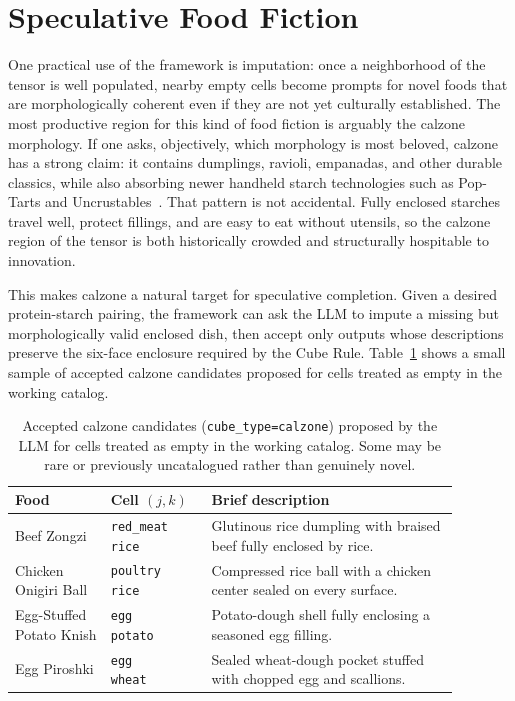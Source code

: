 \section{Speculative Food Fiction}

One practical use of the framework is imputation: once a neighborhood of the tensor is well populated, nearby empty cells become prompts for novel foods that are morphologically coherent even if they are not yet culturally established.
The most productive region for this kind of food fiction is arguably the calzone morphology.
If one asks, objectively, which morphology is most beloved, calzone has a strong claim: it contains dumplings, ravioli, empanadas, and other durable classics, while also absorbing newer handheld starch technologies such as Pop-Tarts and Uncrustables~\cite{arko_cube_rule_food}.
That pattern is not accidental.
Fully enclosed starches travel well, protect fillings, and are easy to eat without utensils, so the calzone region of the tensor is both historically crowded and structurally hospitable to innovation.

This makes calzone a natural target for speculative completion.
Given a desired protein-starch pairing, the framework can ask the LLM to impute a missing but morphologically valid enclosed dish, then accept only outputs whose descriptions preserve the six-face enclosure required by the Cube Rule.
Table~\ref{tab:speculative-calzones} shows a small sample of accepted calzone candidates proposed for cells treated as empty in the working catalog.

\begin{table}[!t]
\centering
\footnotesize
\caption{Accepted calzone candidates (\texttt{cube\_type=calzone}) proposed by the LLM for cells treated as empty in the working catalog. Some may be rare or previously uncatalogued rather than genuinely novel.}
\label{tab:speculative-calzones}
\begin{tabular}{@{}p{0.19\linewidth}p{0.20\linewidth}p{0.49\linewidth}@{}}
\toprule
Food & Cell $(j,k)$ & Brief description \\
\midrule
Beef Zongzi & \shortstack[l]{\scriptsize\texttt{red\_meat}\\\scriptsize\texttt{rice}} & Glutinous rice dumpling with braised beef fully enclosed by rice. \\
Chicken Onigiri Ball & \shortstack[l]{\scriptsize\texttt{poultry}\\\scriptsize\texttt{rice}} & Compressed rice ball with a chicken center sealed on every surface. \\
Egg-Stuffed Potato Knish & \shortstack[l]{\scriptsize\texttt{egg}\\\scriptsize\texttt{potato}} & Potato-dough shell fully enclosing a seasoned egg filling. \\
Egg Piroshki & \shortstack[l]{\scriptsize\texttt{egg}\\\scriptsize\texttt{wheat}} & Sealed wheat-dough pocket stuffed with chopped egg and scallions. \\
\bottomrule
\end{tabular}
\end{table}

